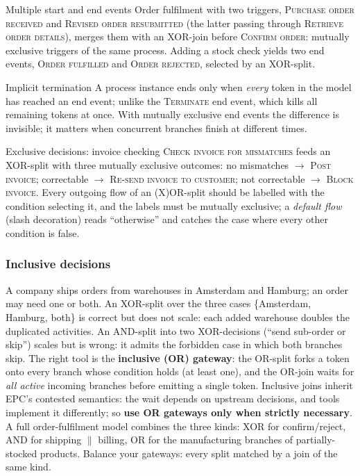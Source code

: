 \begin{examplebox}{Multiple start and end events}
Order fulfilment with two triggers, \textsc{Purchase order received} and \textsc{Revised order resubmitted} (the latter passing through \textsc{Retrieve order details}), merges them with an XOR-join before \textsc{Confirm order}: mutually exclusive triggers of the same process. Adding a stock check yields two end events, \textsc{Order fulfilled} and \textsc{Order rejected}, selected by an XOR-split.
\end{examplebox}

\begin{notebox}{Implicit termination}
A process instance ends only when \emph{every} token in the model has reached an end event; unlike the \textsc{Terminate} end event, which kills all remaining tokens at once. With mutually exclusive end events the difference is invisible; it matters when concurrent branches finish at different times.
\end{notebox}

\begin{examplebox}{Exclusive decisions: invoice checking}
\textsc{Check invoice for mismatches} feeds an XOR-split with three mutually exclusive outcomes: no mismatches $\to$ \textsc{Post invoice}; correctable $\to$ \textsc{Re-send invoice to customer}; not correctable $\to$ \textsc{Block invoice}. Every outgoing flow of an (X)OR-split should be labelled with the condition selecting it, and the labels must be mutually exclusive; a \emph{default flow} (slash decoration) reads ``otherwise'' and catches the case where every other condition is false.
\end{examplebox}

\subsubsection{Inclusive decisions}

A company ships orders from warehouses in Amsterdam and Hamburg; an order may need one or both. An XOR-split over the three cases \{Amsterdam, Hamburg, both\} is correct but does not scale: each added warehouse doubles the duplicated activities. An AND-split into two XOR-decisions (``send sub-order or skip'') scales but is wrong: it admits the forbidden case in which both branches skip. The right tool is the \textbf{inclusive (OR) gateway}: the OR-split forks a token onto every branch whose condition holds (at least one), and the OR-join waits for \emph{all active} incoming branches before emitting a single token. Inclusive joins inherit EPC's contested semantics: the wait depends on upstream decisions, and tools implement it differently; so \textbf{use OR gateways only when strictly necessary}. A full order-fulfilment model combines the three kinds: XOR for confirm/reject, AND for shipping $\|$ billing, OR for the manufacturing branches of partially-stocked products. Balance your gateways: every split matched by a join of the same kind.

